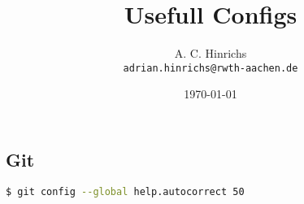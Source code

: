 \documentclass[10pt,landscape,a4paper]{CheatSheet}
\title{Usefull Configs}
\author{A. C. Hinrichs\\\texttt{adrian.hinrichs@rwth-aachen.de}}
\date{\today}
\begin{document}
\begin{multicols}{3}
  \maketitle
  \section{Git}
  \begin{lstlisting}[language=bash]
    $ git config --global help.autocorrect 50
  \end{lstlisting}%
\end{multicols}
\end{document}
